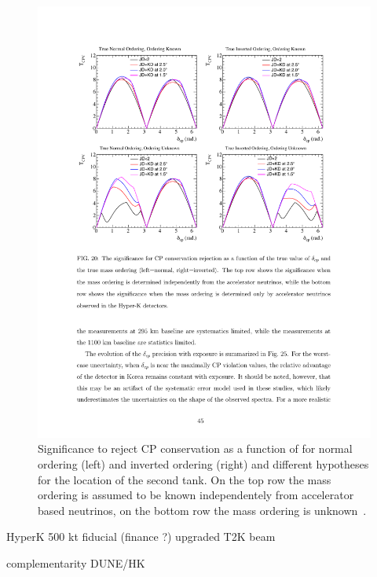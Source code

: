 \begin{figure} [htbp!]
\begin{center}
\includegraphics[width=15cm]{figures/hk_cpv_sensi.pdf}
\caption{\label{fig:hkcpv} Significance to reject CP conservation as a function of \dcp for normal ordering (left) and inverted ordering (right) and different hypotheses for the location of the second tank. On the top row the mass ordering is assumed to be known independentely from accelerator based neutrinos, on the bottom row the mass ordering is unknown~\cite{Abe:2016ero}.}
\end{center}
\end{figure}


HyperK 500 kt fiducial (finance ?) upgraded T2K beam

complementarity DUNE/HK